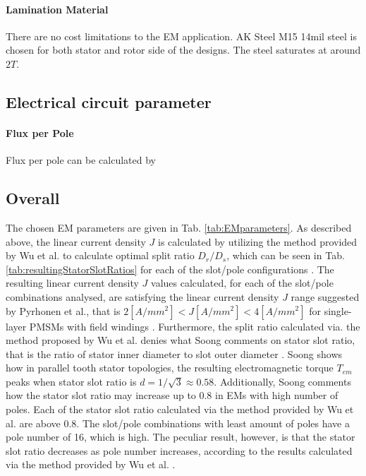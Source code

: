 \documentclass [a4 paper, 11pt, titlepage] {article}
\begin{document}
	\paragraph{Lamination Material} There are no cost limitations to the EM application. AK Steel M15 14mil steel is chosen for both stator and rotor side of the designs. The steel saturates at around $2T$. 
	
	
	
	
	
	
	\subsection{Electrical circuit parameter}
	
	\paragraph{Flux per Pole}
	Flux per pole can be calculated by


	
	
	\subsection{Overall}
	
	The chosen EM parameters are given in Tab. \ref{tab:EMparameters}. As described above, the linear current density $J$ is calculated by utilizing the method provided by Wu et al. to calculate optimal split ratio $D_r/D_s$, which can be seen in Tab. \ref{tab:resultingStatorSlotRatios} for each of the slot/pole configurations \cite{wu_optimal_2010}. The resulting linear current density $J$ values calculated, for each of the slot/pole combinations analysed, are satisfying the linear current density $J$ range suggested by Pyrhonen et al., that is $2 [A/mm^2]<J [A/mm^2]<4 [A/mm^2]$ for single-layer PMSMs with field windings \cite{pyrhonen_design_2014}. Furthermore, the split ratio calculated via. the method proposed by Wu et al. denies what Soong comments on stator slot ratio, that is the ratio of stator inner diameter to slot outer diameter \cite{pellegrino_rediscovery_2016-1}. Soong shows how in parallel tooth stator topologies, the resulting electromagnetic torque $T_{em}$ peaks when stator slot ratio is $d=1/\sqrt{3}\approx0.58$. Additionally, Soong comments how the stator slot ratio may increase up to 0.8 in EMs with high number of poles. Each of the stator slot ratio calculated via the method provided by Wu et al. are above 0.8. The slot/pole combinations with least amount of poles have a pole number of 16, which is high. The peculiar result, however, is that the stator slot ratio decreases as pole number increases, according to the results calculated via the method provided by Wu et al. \cite{wu_optimal_2010}.
	
\end{document}
